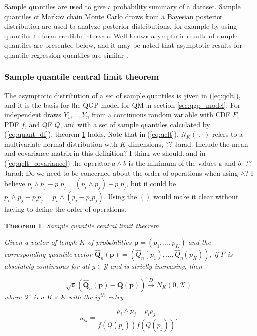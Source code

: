 \documentclass[preprint,12pt,authoryear]{elsarticle}
\newtheorem{theorem}{Theorem}
\newcommand{\1}[1]{\mathds{1}\left[#1\right]}
\newcommand{\jarad}[1]{{\color{red} ?? Jarad: #1}}
\begin{document}
Sample quantiles are used to give a probability summary of a dataset. Sample 
quantiles of Markov chain Monte Carlo draws from a Bayesian posterior 
distribution are used to analyze posterior distributions, for example by using 
quantiles to form credible intervals. 
Well known asymptotic results of sample quantiles are presented below, and it 
may be noted that asymptotic results for quantile regression quantiles are 
similar \cite[]{kocherginsky2005practical, koenker1978regression}. 

\subsubsection{Sample quantile central limit theorem} 

The asymptotic distribution of a set of sample quantiles is given in 
(\ref{eq:qclt}), and it is the basis for the QGP model for QM in section 
\ref{sec:qgp_model}. For independent draws $Y_1, ..., Y_n$ from a continuous 
random variable with CDF $F$, PDF $f$, and QF $Q$, and with a set of sample 
quantiles calculated by (\ref{eq:quant_df}), theorem \ref{thm:qclt} holds. 
Note that in (\ref{eq:qclt}), $N_K(\cdot, \cdot)$ refers to a multivariate 
normal distribution with $K$ dimensions, 
\jarad{Include the mean and covariance matrix in this definition? I think we should.}
and in (\ref{eq:qclt_covariance}) the 
operator $a \wedge b$ is the minimum of the values $a$ and $b$.
\jarad{Do we need to be concerned about the order of operations when using $\wedge$? I believe $p_i \wedge p_j - p_i p_j = (p_i \wedge p_j) - p_i p_j$, but it could be $p_i \wedge p_j - p_i p_j = p_i \wedge (p_j - p_i p_j)$.
Using the $()$ would make it clear without having to define the order of operations.}

\begin{theorem}{\emph{Sample quantile central limit theorem}}
\label{thm:qclt}

Given a vector of length $K$ of probabilities 
$\boldsymbol{p} = (p_1, ..., p_K)$ and the corresponding quantile vector 
$\hat{\boldsymbol{Q}}_n(\boldsymbol{p}) = (\hat{Q}_n(p_1), ..., \hat{Q}_n(p_K))$, 
if $F$ is absolutely continuous for all $y \in \mathcal{Y}$ and is strictly 
increasing, then

\begin{equation}
    \label{eq:qclt}
    \sqrt{n}(\hat{\boldsymbol{Q}}_n(\boldsymbol{p}) - 
    \boldsymbol{Q}(\boldsymbol{p})) \overset{D}{\rightarrow} 
    N_K(0, \boldsymbol{\mathcal{K}})
\end{equation}
where $\boldsymbol{\mathcal{K}}$ is a $K\times K$ with the $ij^{th}$ 
entry 

\begin{equation}
    \label{eq:qclt_covariance}
    \kappa_{ij} = \frac{p_i \wedge p_j - p_i p_j}{f(Q(p_i)) f(Q(p_j))}.
\end{equation}
\end{theorem}
\end{document}
